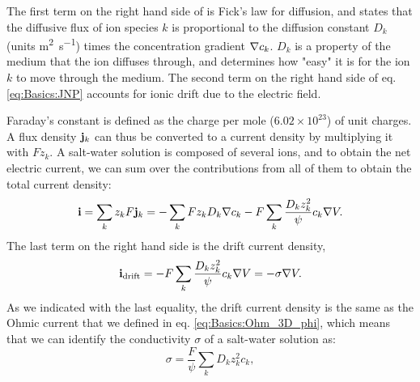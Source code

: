 The first term on the right hand side of  is Fick's law for diffusion, and states that the diffusive flux of ion species $k$ is proportional to the diffusion constant ${D}_k$ (units \si{\square\metre\per\second}) times the concentration gradient ${\bf \nabla} c_{k}$. ${D}_k$ is a property of the medium that the ion diffuses through, and determines how "easy" it is for the ion $k$ to move through the medium. The second term on the right hand side of eq. \ref{eq:Basics:JNP} accounts for ionic drift due to the electric field. 

Faraday's constant is defined as the charge per mole ($6.02\times10^{23}$) of unit charges. A flux density ${\bf j}_k$ can thus be converted to a current density by multiplying it with $Fz_k$. A salt-water solution is composed of several ions, and to obtain the net electric current, we can sum over the contributions from all of them to obtain the total current density:
\begin{equation}
{\bf i} = \sum_k z_k F {\bf j}_k = -\sum_k{F z_k {D_k}{\bf \nabla} c_{k}} - F\sum_{k} \frac{{D_k} z_{k}^2}{\psi}c_{k} {\bf \nabla}{V}.
\label{eq:Basics:iNP}
\end{equation}
The last term on the right hand side is the drift current density,
\begin{equation}
{\bf i}_\text{drift} = - F\sum_{k} \frac{{D_k} z_{k}^2}{\psi}c_{k} {\bf \nabla}{V} = - \sigma {\bf \nabla}{V}.
\label{eq:Basics:idrift}
\end{equation}
As we indicated with the last equality, the drift current density is the same as the Ohmic current that we defined in eq. \ref{eq:Basics:Ohm_3D_phi}, which means that we can identify the conductivity $\sigma$ of a salt-water solution as:
\begin{equation}
\sigma = \frac{F}{\psi}\sum_{k} {D}_k z_{k}^2 c_{k},
\label{eq:Basics:sigma_conc}
\end{equation}


